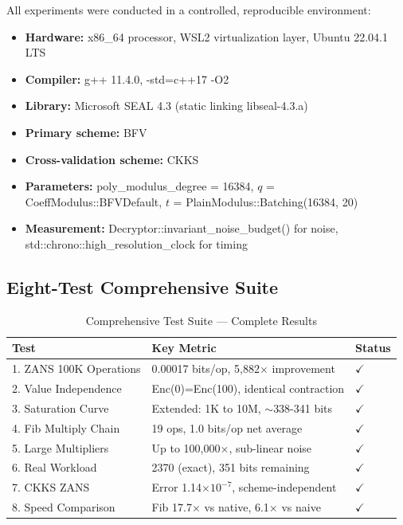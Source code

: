 \documentclass[11pt]{article}
\begin{document}
All experiments were conducted in a controlled, reproducible environment:
\begin{itemize}
    \item \textbf{Hardware:} x86\_64 processor, WSL2 virtualization layer, Ubuntu 22.04.1 LTS
    \item \textbf{Compiler:} g++ 11.4.0, -std=c++17 -O2
    \item \textbf{Library:} Microsoft SEAL 4.3 (static linking libseal-4.3.a)
    \item \textbf{Primary scheme:} BFV
    \item \textbf{Cross-validation scheme:} CKKS
    \item \textbf{Parameters:} poly\_modulus\_degree = 16384, $q$ = CoeffModulus::BFVDefault, $t$ = PlainModulus::Batching(16384, 20)
    \item \textbf{Measurement:} Decryptor::invariant\_noise\_budget() for noise, std::chrono::high\_resolution\_clock for timing
\end{itemize}

\subsection{Eight-Test Comprehensive Suite}

\begin{table}[h]
\centering
\caption{Comprehensive Test Suite — Complete Results}
\begin{tabular}{l|l|l}
\textbf{Test} & \textbf{Key Metric} & \textbf{Status} \\
\hline
1. ZANS 100K Operations & 0.00017 bits/op, 5,882$\times$ improvement & $\checkmark$ \\
2. Value Independence & Enc(0)=Enc(100), identical contraction & $\checkmark$ \\
3. Saturation Curve & Extended: 1K to 10M, $\sim$338-341 bits & $\checkmark$ \\
4. Fib Multiply Chain & 19 ops, 1.0 bits/op net average & $\checkmark$ \\
5. Large Multipliers & Up to 100,000$\times$, sub-linear noise & $\checkmark$ \\
6. Real Workload & 2370 (exact), 351 bits remaining & $\checkmark$ \\
7. CKKS ZANS & Error 1.14$\times 10^{-7}$, scheme-independent & $\checkmark$ \\
8. Speed Comparison & Fib 17.7$\times$ vs native, 6.1$\times$ vs naive & $\checkmark$
\end{tabular}
\end{table}
\end{document}
